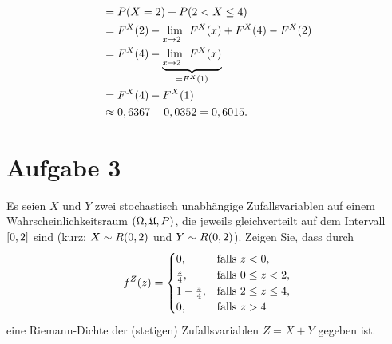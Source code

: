 \documentclass{exercise}
\begin{document}
\begin{enumerate}
\begin{enumerate}
\begin{align*}
                &= P\parentheses*{X = 2} + P\parentheses*{2 < X \le 4}\\
                &= F^X\parentheses*{2} - \lim_{x \to 2^-}F^X\parentheses*{x} + F^{X}\parentheses*{4} - F^X\parentheses*{2}\\
                &= F^X\parentheses*{4} - \underbrace{\lim_{x \to 2^-}F^X\parentheses*{x}}_{= F^X\parentheses*{1}}\\
                &= F^X\parentheses*{4} - F^X\parentheses*{1}\\
                &\approx 0,6367 - 0,0352 = 0,6015.
            \end{align*}
        \end{enumerate} 
    \end{enumerate}


    \section*{Aufgabe 3}

    \begin{problem}
        Es seien \(X\) und \(Y\) zwei stochastisch unabhängige Zufallsvariablen auf einem Wahrscheinlichkeitsraum \(\parentheses*{\Omega, \mathfrak{U}, P}\), die jeweils gleichverteilt auf dem Intervall \(\brackets*{0, 2}\) sind (kurz: \(X \sim R\parentheses*{0, 2}\) und \(Y \sim R\parentheses*{0, 2}\)).
        Zeigen Sie, dass durch
        \[
            f^Z\parentheses*{z} = \begin{cases}
                0, & \text{falls }z < 0,\\
                \frac{z}{4}, & \text{falls }0 \le z < 2,\\
                1 - \frac{z}{4}, & \text{falls }2 \le z \le 4,\\
                0, & \text{falls }z > 4
            \end{cases}
        \]
        eine Riemann-Dichte der (stetigen) Zufallsvariablen \(Z = X + Y\) gegeben ist.
    \end{problem}
\end{document}
